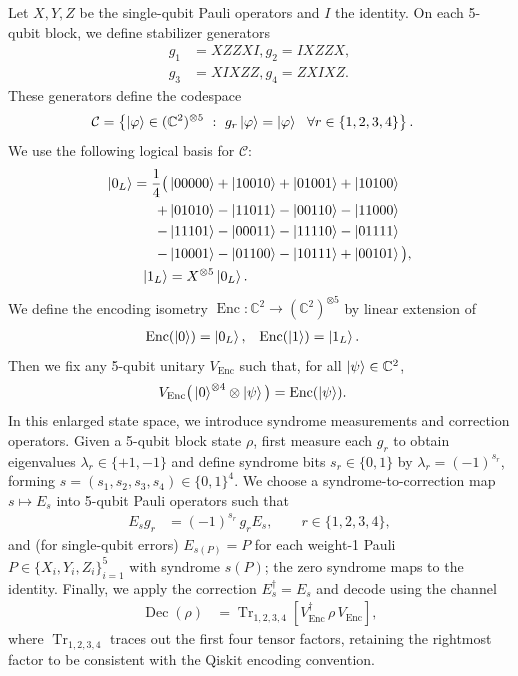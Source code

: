 \documentclass[aps,physrev,10pt,twocolumn,superscriptaddress,floatfix]{revtex4-2}
\DeclareMathOperator{\Enc}{Enc}
\DeclareMathOperator{\Dec}{Dec}
\begin{document}
Let $X,Y,Z$ be the single-qubit Pauli operators and $I$ the identity.
On each 5-qubit block, we define stabilizer generators
\begin{align}
g_1 &= XZZXI, g_2 = IXZZX, \nonumber \\
g_3 &= XIXZZ, g_4 = ZXIXZ.\label{eq:stabilizers}
\end{align}
These generators define the codespace
\begin{align}
\mathcal{C}
&= \left\{\ket{\varphi}\in(\mathbb{C}^2)^{\otimes 5} ~:~ g_r\ket{\varphi}=\ket{\varphi}\ \ \forall r\in\{1,2,3,4\}\right\}.
\end{align}
We use the following logical basis for $\mathcal{C}$:
\begin{align}
\ket{0_L} = \frac{1}{4}\big(&\ket{00000}+\ket{10010}+\ket{01001}+\ket{10100} \nonumber \\
+&\ket{01010} -\ket{11011}-\ket{00110}-\ket{11000} \nonumber \\
-&\ket{11101}-\ket{00011}-\ket{11110}-\ket{01111} \nonumber \\
-&\ket{10001} -\ket{01100}-\ket{10111}+\ket{00101}\big), \\
\ket{1_L}
&= X^{\otimes 5}\ket{0_L}.
\end{align}
We define the encoding isometry $\Enc:\mathbb{C}^2\to(\mathbb{C}^2)^{\otimes 5}$ by linear extension of
\begin{align}
\Enc(\ket{0}) &= \ket{0_L}, &
\Enc(\ket{1}) &= \ket{1_L}.
\end{align}
Then we fix any 5-qubit unitary $V_{\Enc}$ such that, for all $\ket{\psi}\in\mathbb{C}^2$,
\begin{align}
V_{\Enc}\big(\ket{0}^{\otimes 4}\otimes\ket{\psi}\big)
&= \Enc(\ket{\psi}).
\end{align}
In this enlarged state space, we introduce syndrome measurements and correction operators. Given a 5-qubit block state $\rho$, first measure each $g_r$ to obtain eigenvalues $\lambda_r\in\{+1,-1\}$ and define
syndrome bits $s_r\in\{0,1\}$ by $\lambda_r=(-1)^{s_r}$, forming $s=(s_1,s_2,s_3,s_4)\in\{0,1\}^4$. We choose a syndrome-to-correction map $s\mapsto E_s$ into 5-qubit Pauli operators such that
\begin{align}
E_s g_r
&= (-1)^{s_r}\, g_r E_s,
\qquad r\in\{1,2,3,4\},
\end{align}
and (for single-qubit errors) $E_{s(P)}=P$ for each weight-1 Pauli $P\in\{X_i,Y_i,Z_i\}_{i=1}^5$ with syndrome $s(P)$; the zero syndrome maps to the identity. Finally, we apply the correction $E_s^\dagger=E_s$ and decode using the channel
\begin{align}
\Dec(\rho)
&= \operatorname{Tr}_{1,2,3,4}\!\left[V_{\Enc}^\dagger\,\rho\,V_{\Enc}\right],
\end{align}
where $\operatorname{Tr}_{1,2,3,4}$ traces out the first four tensor factors, retaining the rightmost factor to be consistent with the Qiskit encoding convention.
\end{document}
